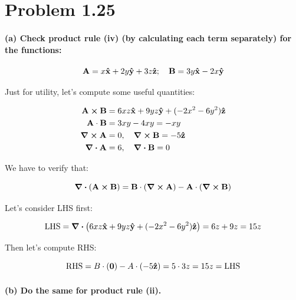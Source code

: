 \documentclass{article}
\numberwithin{equation}{section}
\newcommand{\vbh}[1]{\vb{\hat{#1}}}
\begin{document}
\section{Problem 1.25}

\paragraph{(a) Check product rule (iv) (by calculating each term separately) for the functions: \\}

\begin{equation*}
    \vb{A} = x \vb{\hat{x}} + 2y \vbh{y} + 3z \vbh{z}; \quad \vb{B} = 3y \vbh{x} - 2x \vbh{y}
\end{equation*}

Just for utility, let's compute some useful quantities:

\begin{equation}
    \begin{split}
        \vb{A \cross B} &= 6xz \vbh{x} + 9yz \vbh{y} + (- 2x^2 - 6y^2) \vbh{z} \\
        \vb{A \cdot B} &= 3xy - 4xy = -xy \\
        \vb{\curl A} &= 0, \quad \vb{\curl B} = -5 \vbh{z} \\
        \vb{\div A} &= 6, \quad \vb{\div B} = 0
    \end{split}
\end{equation}

We have to verify that:

\begin{equation}
    \vb{\div (A \cross B) = B \cdot (\curl A) - A \cdot (\curl B) }
\end{equation}

Let's consider LHS first:

\begin{equation}
    \text{LHS} = \div (6xz \vbh{x} + 9yz \vbh{y} + (- 2x^2 - 6y^2) \vbh{z}) = 6z  + 9z = 15z
\end{equation}

Then let's compute RHS:

\begin{equation}
    \text{RHS} = B \cdot (\vb{0}) - A \cdot (-5 \vbh{z}) = 5\cdot3z = 15 z = \text{LHS}
\end{equation}

\paragraph{(b) Do the same for product rule (ii).\\}
\end{document}
